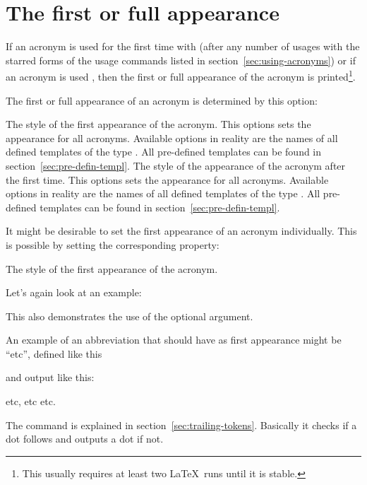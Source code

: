 \documentclass{acro-manual}
\begin{document}
\section{The first or full appearance}\label{sec:first-or-full}
If an acronym is used for the first time with  (after any number of
usages with the starred forms of the usage commands listed in
section~\vref{sec:using-acronyms}) or if an acronym is used , then the
first or full appearance of the acronym is printed\footnote{This usually
  requires at least two \LaTeX\ runs until it is stable.}.

The first or full appearance of an acronym is determined by this option:
\begin{options}
    The style of the first appearance of the acronym. This options sets the
    appearance for all acronyms.  Available options in reality are the names
    of all defined templates of the type . All pre-defined
    templates can be found in section~\vref{sec:pre-defin-templ}.
    The style of the appearance of the acronym after the
    first time. This options sets the appearance for all acronyms.  Available
    options in reality are the names of all defined templates of the type
    . All pre-defined templates can be found in
    section~\vref{sec:pre-defin-templ}.
\end{options}
It might be desirable to set the first appearance of an acronym
individually. This is possible by setting the corresponding property:
\begin{properties}
  \Default
    The style of the first appearance of the acronym.
\end{properties}
Let's again look at an example:
This also demonstrates the use of the optional argument.

An example of an abbreviation that should have  as first appearance
might be \enquote{\acs*{etc}}, defined like this
\begin{sourcecode}
\end{sourcecode}
and output like this:
\begin{example}
  \ac{etc}, \ac{etc} \ac{etc}.
\end{example}
The command  is explained in section~\vref{sec:trailing-tokens}.
Basically it checks if a dot follows and outputs a dot if not.
\end{document}

